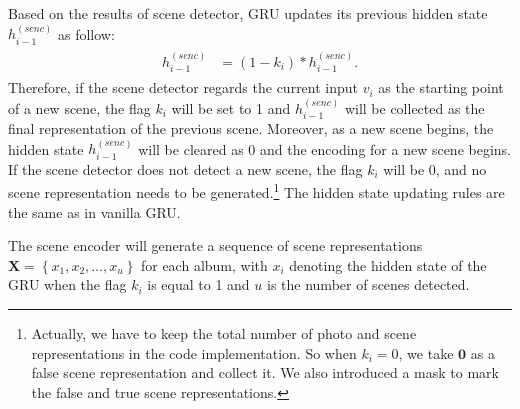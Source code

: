 \documentclass[letterpaper]{article} \usepackage{aaai19}  \usepackage{times}  \usepackage{helvet}  \usepackage{courier}  \usepackage{url}  \usepackage{graphicx}  \usepackage{color}
\begin{document}
Based on the results of scene detector, GRU updates its previous hidden state $h^{(senc)}_{i-1}$ as follow:
\begin{align}
\label{eq:update_state}
  \begin{split}
  	h^{(senc)}_{i-1} &= ( 1 - k_i ) * h^{(senc)}_{i-1}.  \end{split}
\end{align}
Therefore, if the scene detector regards the current input $v_i$ as the starting point of a new scene, the flag $k_i$ will be set to 1 and $h^{(senc)}_{i-1}$ will be collected as the final representation of the previous scene. Moreover, as a new scene begins, the hidden state $h^{(senc)}_{i-1}$ will be cleared as 0 and the encoding for a new scene begins. If the scene detector does not detect a new scene,  the flag $k_i$ will be 0, and no scene representation needs to be generated.\footnote{Actually, we have to keep the total number of photo and scene representations in the code implementation. So when $k_i=0$, we take $\mathbf{0}$ as a false scene representation and collect it. We also introduced a mask to mark the false and true scene representations.} The hidden state updating rules are the same as in vanilla GRU.


The scene encoder will generate a sequence of scene representations $\mathbf{X}=\left\{x_1,x_2, \dots, x_u\right\}$ for each album, with $x_i$ denoting the hidden state of the GRU when the flag $k_i$ is equal to 1 and $u$ is the number of scenes detected.
\end{document}
